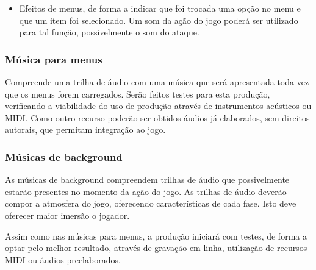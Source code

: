 \begin{itemize}
\item Efeitos de menus, de forma a indicar que foi trocada uma opção no 
menu e que um item foi selecionado. Um som da ação do jogo poderá ser
 utilizado para tal função, possivelmente o som do ataque.
\end{itemize}

\subsubsection{Música para menus}
Compreende uma trilha de áudio com uma música que será apresentada toda
 vez que os menus forem carregados. Serão feitos testes para esta produção, 
verificando a viabilidade do uso de produção através de instrumentos
 acústicos ou MIDI. Como outro recurso poderão ser obtidos áudios já
 elaborados, sem direitos autorais, que permitam integração ao jogo.

\subsubsection{Músicas de background}
As músicas de background compreendem trilhas de áudio que possivelmente
 estarão presentes no momento da ação do jogo. As trilhas de áudio 
deverão compor a atmosfera do jogo, oferecendo características de 
cada fase. Isto deve oferecer maior imersão o jogador.

Assim como nas músicas para menus, a produção iniciará com testes, de 
forma a optar pelo melhor resultado, através de gravação em linha,
 utilização de recursos MIDI ou áudios preelaborados.
